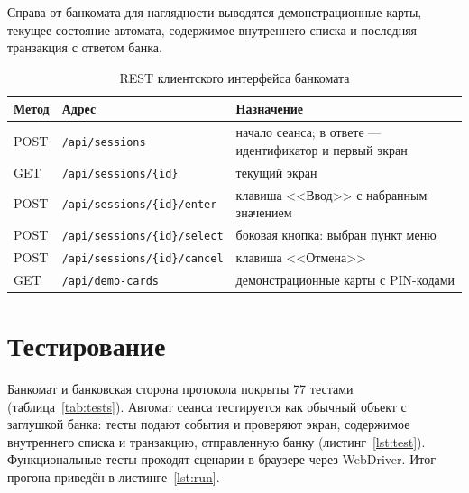 \documentclass[14pt,a4paper]{extarticle}
\begin{document}
Справа от банкомата для наглядности выводятся демонстрационные карты, текущее состояние
автомата, содержимое внутреннего списка и последняя транзакция с ответом банка.

\begin{table}[H]
\caption{REST клиентского интерфейса банкомата}
\label{tab:rest}
\centering
\small
\begin{tabularx}{\textwidth}{llX}
\toprule
Метод & Адрес & Назначение \\
\midrule
POST & \texttt{/api/sessions} & начало сеанса; в ответе --- идентификатор и первый экран \\
GET & \texttt{/api/sessions/\{id\}} & текущий экран \\
POST & \texttt{/api/sessions/\{id\}/enter} & клавиша <<Ввод>> с набранным значением \\
POST & \texttt{/api/sessions/\{id\}/select} & боковая кнопка: выбран пункт меню \\
POST & \texttt{/api/sessions/\{id\}/cancel} & клавиша <<Отмена>> \\
GET & \texttt{/api/demo-cards} & демонстрационные карты с PIN-кодами \\
\bottomrule
\end{tabularx}
\end{table}

\section{Тестирование}

Банкомат и банковская сторона протокола покрыты 77 тестами
(таблица~\ref{tab:tests}). Автомат сеанса тестируется как обычный объект с заглушкой банка:
тесты подают события и проверяют экран, содержимое внутреннего списка и транзакцию,
отправленную банку (листинг~\ref{lst:test}). Функциональные тесты проходят сценарии в
браузере через WebDriver. Итог прогона приведён в листинге~\ref{lst:run}.
\end{document}
